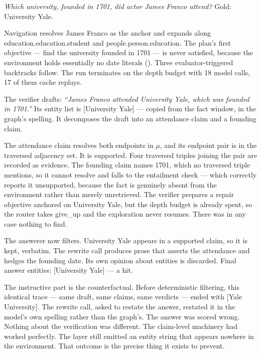 \emph{Which university, founded in 1701, did actor James Franco attend?} Gold:
\textsf{University Yale}.

Navigation resolves \textsf{James Franco} as the anchor and expands along
\textsf{education.\allowbreak education.\allowbreak student} and
\textsf{people.\allowbreak person.\allowbreak education}. The plan's first
objective --- find the university founded in 1701 --- is never satisfied,
because the environment holds essentially no date literals
(). Three evaluator-triggered backtracks follow. The
run terminates on the depth budget with 18 model calls, 17 of them cache
replays.

The verifier drafts: \emph{``James Franco attended University Yale, which was
founded in 1701.''} Its entity list is \textsf{[University Yale]} --- copied
from the fact window, in the graph's spelling. It decomposes the draft into an
attendance claim and a founding claim.

The attendance claim resolves both endpoints in $\mu$, and its endpoint pair
is in the traversed adjacency set. It is supported. Four traversed triples
joining the pair are recorded as evidence. The founding claim names
\textsf{1701}, which no traversed triple mentions, so it cannot resolve and
falls to the entailment check --- which correctly reports it unsupported,
because the fact is genuinely absent from the environment rather than merely
unretrieved. The verifier prepares a repair objective anchored on
\textsf{University Yale}, but the depth budget is already spent, so the router
takes \textsf{give\_up} and the exploration never resumes. There was in any
case nothing to find.

The answerer now filters. \textsf{University Yale} appears in a supported claim,
so it is kept, verbatim. The rewrite call produces prose that asserts the
attendance and hedges the founding date. Its own opinion about entities is
discarded. Final answer entities: \textsf{[University Yale]} --- a hit.

The instructive part is the counterfactual. Before deterministic filtering, this
identical trace --- same draft, same claims, same verdicts --- ended with
\textsf{[Yale University]}. The rewrite call, asked to restate the answer,
restated it in the model's own spelling rather than the graph's. The answer
was scored wrong. Nothing about the verification was different. The claim-level
machinery had worked perfectly. The layer still emitted an entity string that
appears nowhere in the environment. That outcome is the precise thing it
exists to prevent.

